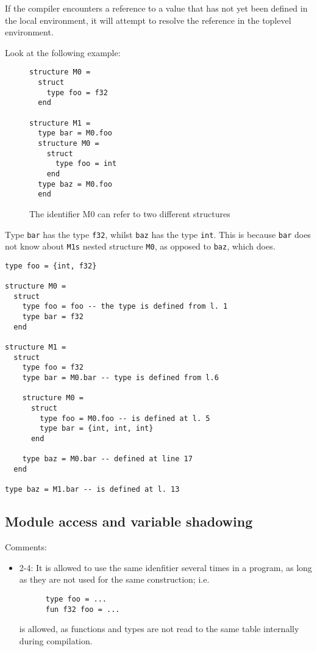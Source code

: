 If the compiler encounters a reference to a value that has not yet been defined
in the local environment, it will attempt to resolve the reference in the
toplevel environment.

Look at the following example:

\begin{figure}
\begin{verbatim}
structure M0 =
  struct
    type foo = f32
  end

structure M1 =
  type bar = M0.foo
  structure M0 =
    struct
      type foo = int
    end
  type baz = M0.foo
  end
\end{verbatim}
  \caption{The identifier M0 can refer to two different structures}
\end{figure}
Type \texttt{bar} has the type \texttt{f32}, whilst \texttt{baz} has the type
\texttt{int}.
This is because \texttt{bar} does not know about \texttt{M1s} nested structure
\texttt{M0}, as opposed to \texttt{baz}, which does.

\begin{verbatim}
type foo = {int, f32}

structure M0 =
  struct
    type foo = foo -- the type is defined from l. 1
    type bar = f32
  end

structure M1 =
  struct
    type foo = f32
    type bar = M0.bar -- type is defined from l.6

    structure M0 =
      struct
        type foo = M0.foo -- is defined at l. 5
        type bar = {int, int, int}
      end

    type baz = M0.bar -- defined at line 17
  end

type baz = M1.bar -- is defined at l. 13
\end{verbatim}

\subsection{Module access and variable shadowing}

Comments:
\begin{itemize}
  \item 2-4: It is allowed to use the same idenfitier several times in a
    program, as long as they are not used for the same construction; i.e.
    \begin{verbatim}
      type foo = ...
      fun f32 foo = ...
    \end{verbatim} is allowed, as functions and types are not read to the same
    table internally during compilation.
  \end{itemize}

